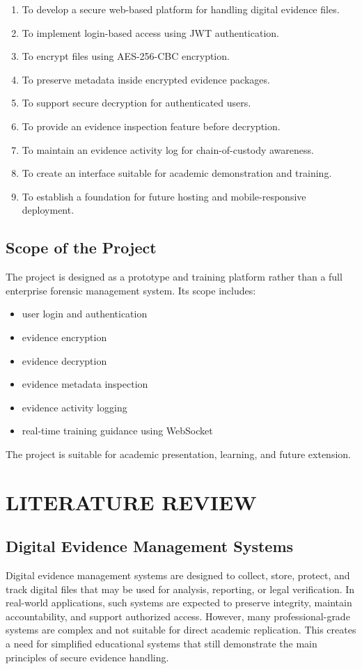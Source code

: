 \documentclass[12pt,a4paper]{report}
\begin{document}
\begin{enumerate}
\item To develop a secure web-based platform for handling digital evidence files.
\item To implement login-based access using JWT authentication.
\item To encrypt files using AES-256-CBC encryption.
\item To preserve metadata inside encrypted evidence packages.
\item To support secure decryption for authenticated users.
\item To provide an evidence inspection feature before decryption.
\item To maintain an evidence activity log for chain-of-custody awareness.
\item To create an interface suitable for academic demonstration and training.
\item To establish a foundation for future hosting and mobile-responsive deployment.
\end{enumerate}

\section{Scope of the Project}
The project is designed as a prototype and training platform rather than a full enterprise forensic management system. Its scope includes:

\begin{itemize}
\item user login and authentication
\item evidence encryption
\item evidence decryption
\item evidence metadata inspection
\item evidence activity logging
\item real-time training guidance using WebSocket
\end{itemize}

The project is suitable for academic presentation, learning, and future extension.

\chapter{LITERATURE REVIEW}

\section{Digital Evidence Management Systems}
Digital evidence management systems are designed to collect, store, protect, and track digital files that may be used for analysis, reporting, or legal verification. In real-world applications, such systems are expected to preserve integrity, maintain accountability, and support authorized access. However, many professional-grade systems are complex and not suitable for direct academic replication. This creates a need for simplified educational systems that still demonstrate the main principles of secure evidence handling.
\end{document}
